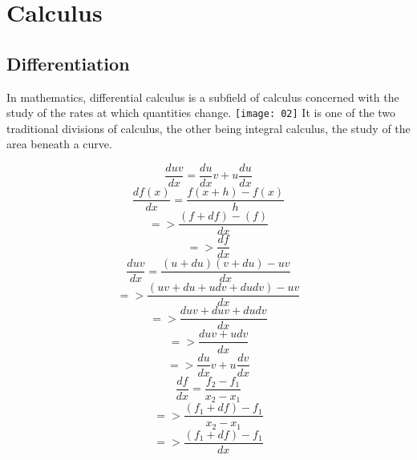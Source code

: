 
\graphicspath{ {./Pictures/} }

\chapter{Calculus}
\section{Differentiation}

	In mathematics, differential calculus is a subfield of calculus concerned with the study of the rates at which quantities change.
	\texttt{[image: 02]}
	It is one of the two traditional divisions of calculus, the other being integral calculus, the study of the area beneath a curve.
	
	\begin{equation}
	\frac{duv}{dx}=\frac{du}{dx}v+u\frac{du}{dx}
	\end{equation}
	\begin{displaymath}
	\frac{df(x)}{dx} = \frac{f(x+h)-f(x)}{h}
	\end{displaymath}
	\begin{displaymath}
	=> \frac{(f+df)-(f)}{dx}
	\end{displaymath}
	\begin{displaymath}
	=>\frac{df}{dx}
	\end{displaymath}
	\newline
	\begin{displaymath}
	\frac{duv}{dx} = \frac{(u+du)(v+du)-uv}{dx}
	\end{displaymath}
	\begin{displaymath}
	=>\frac{(uv+du+udv+dudv)-uv}{dx}
	\end{displaymath}
	\begin{displaymath}
	=> \frac{duv+duv+dudv}{dx}
	\end{displaymath}
	\begin{displaymath}
	=> \frac{duv+udv}{dx}
	\end{displaymath}
	\begin{displaymath}
	=> \frac{du}{dx}v+u\frac{dv}{dx}
	\end{displaymath}
	\newline
	\begin{displaymath}
	\frac{df}{dx} = \frac{f_2-f_1}{x_2-x_1}
	\end{displaymath}
	\begin{displaymath}
	=>\frac{(f_1+df)-f_1}{x_2-x_1}
	\end{displaymath}
	\begin{displaymath}
	=>\frac{(f_1+df)-f_1}{dx}
	\end{displaymath}
	
